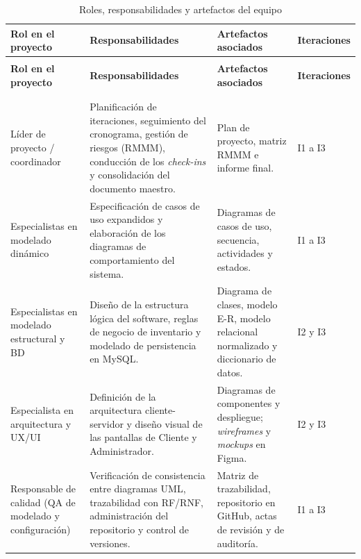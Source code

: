 {\small
\begin{xltabular}{\textwidth}{|>{\raggedright\arraybackslash}p{2.8cm}|X|>{\raggedright\arraybackslash}p{3.6cm}|>{\raggedright\arraybackslash}p{1.8cm}|}
    \caption{Roles, responsabilidades y artefactos del equipo}
    \label{tab:roles_equipo} \\
    \hline
    \textbf{Rol en el proyecto} & \textbf{Responsabilidades} & \textbf{Artefactos asociados} & \textbf{Iteraciones} \\
    \hline
    \endfirsthead

     \\
    \hline
    \textbf{Rol en el proyecto} & \textbf{Responsabilidades} & \textbf{Artefactos asociados} & \textbf{Iteraciones} \\
    \hline
    \endhead

     \\
    \endfoot

     \\
    \endlastfoot

    Líder de proyecto / coordinador & Planificación de iteraciones, seguimiento del cronograma, gestión de riesgos (RMMM), conducción de los \textit{check-ins} y consolidación del documento maestro. & Plan de proyecto, matriz RMMM e informe final. & I1 a I3 \\*
    \hline
    Especialistas en modelado dinámico & Especificación de casos de uso expandidos y elaboración de los diagramas de comportamiento del sistema. & Diagramas de casos de uso, secuencia, actividades y estados. & I1 a I3 \\*
    \hline
    Especialistas en modelado estructural y BD & Diseño de la estructura lógica del software, reglas de negocio de inventario y modelado de persistencia en MySQL. & Diagrama de clases, modelo E-R, modelo relacional normalizado y diccionario de datos. & I2 y I3 \\*
    \hline
    Especialista en arquitectura y UX/UI & Definición de la arquitectura cliente-servidor y diseño visual de las pantallas de Cliente y Administrador. & Diagramas de componentes y despliegue; \textit{wireframes} y \textit{mockups} en Figma. & I2 y I3 \\*
    \hline
    Responsable de calidad (QA de modelado y configuración) & Verificación de consistencia entre diagramas UML, trazabilidad con RF/RNF, administración del repositorio y control de versiones. & Matriz de trazabilidad, repositorio en GitHub, actas de revisión y de auditoría. & I1 a I3 \\
    \hline
\end{xltabular}
}


